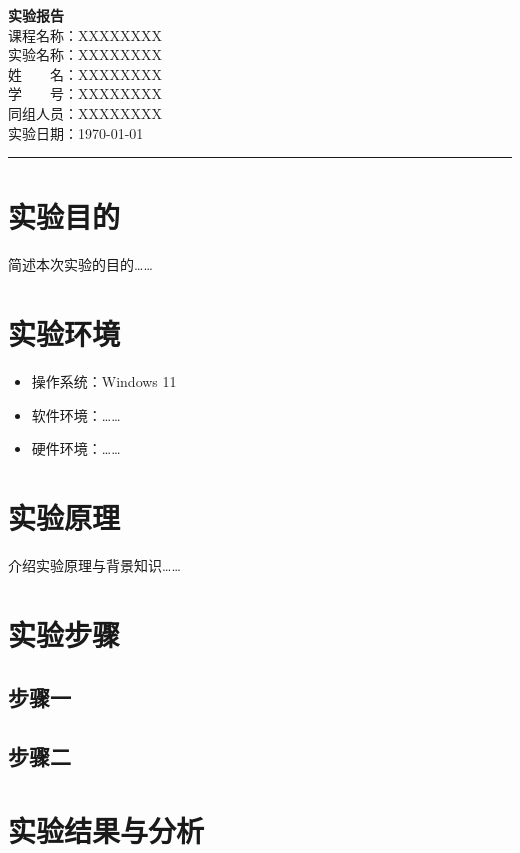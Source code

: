 \documentclass[UTF8,a4paper,12pt]{ctexart}
\begin{document}
\begin{center}
  {\LARGE\bfseries 实验报告} \\[1em]
  {\large 课程名称：XXXXXXXX} \\[0.5em]
  实验名称：XXXXXXXX \\[0.5em]
  姓~~~~名：XXXXXXXX \\[0.5em]
  学~~~~号：XXXXXXXX \\[0.5em]
  同组人员：XXXXXXXX \\[0.5em]
  实验日期：\today
\end{center}

\hrule
\vspace{1em}

\section{实验目的}

简述本次实验的目的……

\section{实验环境}

\begin{itemize}
  \item 操作系统：Windows 11
  \item 软件环境：……
  \item 硬件环境：……
\end{itemize}

\section{实验原理}

介绍实验原理与背景知识……

\section{实验步骤}

\subsection{步骤一}

\subsection{步骤二}

\section{实验结果与分析}
\end{document}
